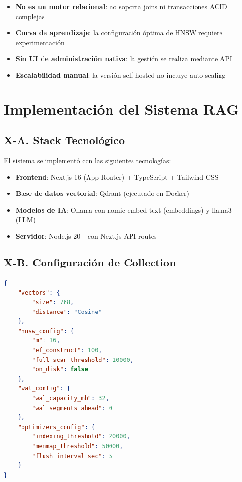 \documentclass[conference]{IEEEtran}
\begin{document}
\begin{itemize}
    \item \textbf{No es un motor relacional}: no soporta joins ni transacciones ACID complejas
    \item \textbf{Curva de aprendizaje}: la configuración óptima de HNSW requiere experimentación
    \item \textbf{Sin UI de administración nativa}: la gestión se realiza mediante API
    \item \textbf{Escalabilidad manual}: la versión self-hosted no incluye auto-scaling
\end{itemize}

\section{Implementación del Sistema RAG}
\label{sec:implementacion}

\subsection{X-A. Stack Tecnológico}

El sistema se implementó con las siguientes tecnologías:

\begin{itemize}
    \item \textbf{Frontend}: Next.js 16 (App Router) + TypeScript + Tailwind CSS
    \item \textbf{Base de datos vectorial}: Qdrant (ejecutado en Docker)
    \item \textbf{Modelos de IA}: Ollama con nomic-embed-text (embeddings) y llama3 (LLM)
    \item \textbf{Servidor}: Node.js 20+ con Next.js API routes
\end{itemize}

\subsection{X-B. Configuración de Collection}

\begin{lstlisting}[language=json, caption={Configuración de collection en Qdrant}]
{
    "vectors": {
        "size": 768,
        "distance": "Cosine"
    },
    "hnsw_config": {
        "m": 16,
        "ef_construct": 100,
        "full_scan_threshold": 10000,
        "on_disk": false
    },
    "wal_config": {
        "wal_capacity_mb": 32,
        "wal_segments_ahead": 0
    },
    "optimizers_config": {
        "indexing_threshold": 20000,
        "memmap_threshold": 50000,
        "flush_interval_sec": 5
    }
}
\end{lstlisting}
\end{document}
